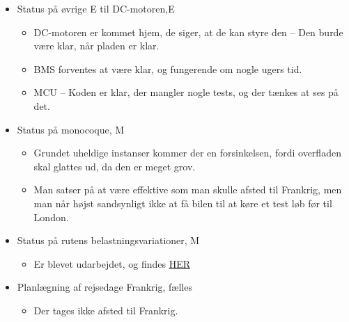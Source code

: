 \begin{enumerate}
			\begin{itemize}
				\item Status på øvrige E til DC-motoren,E
					\begin{itemize}
						\item DC-motoren er kommet hjem, de siger, at de kan styre den – Den burde være klar, når pladen er klar.
						\item BMS forventes at være klar, og fungerende om nogle ugers tid.
						\item MCU – Koden er klar, der mangler nogle tests, og der tænkes at ses på det.
					\end{itemize}
			\end{itemize}
			
			\begin{itemize}
				\item Status på monocoque, M
					\begin{itemize}
						\item Grundet uheldige instanser kommer der en forsinkelsen, fordi overfladen skal glattes ud, da den er meget grov.
						\item Man satser på at være effektive som man skulle afsted til Frankrig, men man når højst sandsynligt ikke at få bilen til at køre et test løb før til London. 
					\end{itemize}
			\end{itemize}
	
			\begin{itemize}
				\item Status på rutens belastningsvariationer, M
					\begin{itemize}
						\item Er blevet udarbejdet, og findes
						\href{<https://www.dropbox.com/s/rn7g23q643xp2ua/Topographie\%20of\%20the\%20track\%20WITH\%20Force\%20Torque\%20and\%20Power.xlsx?dl=0>}{HER}
					\end{itemize}
			\end{itemize}
			
			\begin{itemize}
				\item Planlægning af rejsedage Frankrig, fælles
				\begin{itemize}
					\item Der tages ikke afsted til Frankrig.
				\end{itemize}
			\end{itemize}		
			

\end{enumerate}

